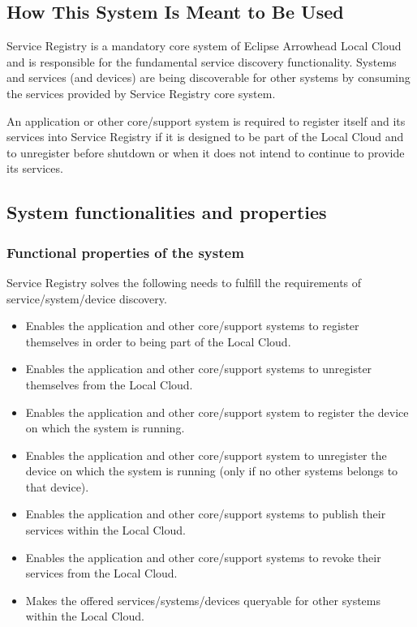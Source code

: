 \documentclass[a4paper]{arrowhead}
\begin{document}
\subsection{How This System Is Meant to Be Used}
\label{sec:use}

Service Registry is a mandatory core system of Eclipse Arrowhead Local Cloud and is responsible for the fundamental service discovery functionality. Systems and services (and devices) are being discoverable for other systems by consuming the services provided by Service Registry core system.

An application or other core/support system is required to register itself and its services into Service Registry if it is designed to be part of the Local Cloud and to unregister before shutdown or when it does not intend to continue to provide its services.

\subsection{System functionalities and properties}
\label{sec:properties}

\subsubsection {Functional properties of the system}
Service Registry solves the following needs to fulfill the requirements of service/system/device discovery.

\begin{itemize}
    \item Enables the application and other core/support systems to register themselves in order to being part of the Local Cloud.
    \item Enables the application and other core/support systems to unregister themselves from the Local Cloud.
    \item Enables the application and other core/support system to register the device on which the system is running.
    \item Enables the application and other core/support system to unregister the device on which the system is running (only if no other systems belongs to that device).
    \item Enables the application and other core/support systems to publish their services within the Local Cloud.
    \item Enables the application and other core/support systems to revoke their services from the Local Cloud.
    \item Makes the offered services/systems/devices queryable for other systems within the Local Cloud.
\end{itemize}
\end{document}
